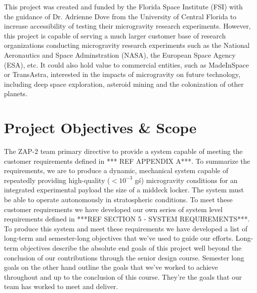 This project was created and funded by the Florida Space Institute (FSI) with the guidance of Dr. Adrienne Dove from the University of Central Florida to increase accessibility of testing their microgravity research experiments. However, this project is capable of serving a much larger customer base of research organizations conducting microgravity research experiments such as the National Aeronautics and Space Adminstration (NASA), the European Space Agency (ESA), etc. It could also hold value to commercial entities, such as MadeInSpace or TransAstra, interested in the impacts of microgravity on future technology, including deep space exploration, asteroid mining and the colonization of other planets.


\section{Project Objectives \& Scope}

\indent\indent The ZAP-2 team primary directive to provide a system capable of meeting the customer requirements defined in *** REF APPENDIX A***. To summarize the requirements, we are to produce a dynamic, mechanical system capable of repeatedly providing high-quality ($< 10^{-3}$ g\'s) microgravity conditions for an integrated experimental payload the size of a middeck locker. The system must be able to operate autonomously in stratospheric conditions. To meet these customer requirements we have developed our own series of system level requirements defined in ***REF SECTION 5 - SYSTEM REQUIREMENTS***. To produce this system and meet these requirements we have developed a list of long-term and semester-long objectives that we've used to guide our efforts. Long-term objectives describe the absolute end goals of this project well beyond the conclusion of our contributions through the senior design course. Semester long goals on the other hand outline the goals that we've worked to achieve throughout and up to the conclusion of this course. They're the goals that our team has worked to meet and deliver. 


